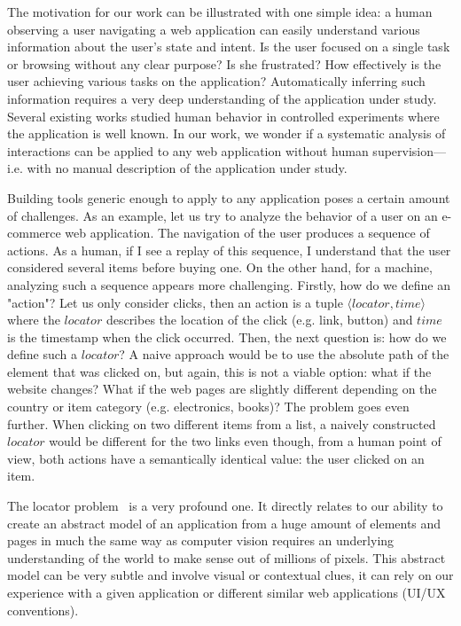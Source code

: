The motivation for our work can be illustrated with one simple idea: a human observing a user navigating a web application can easily understand various information about the user's state and intent.
Is the user focused on a single task or browsing without any clear purpose?
Is she frustrated?
How effectively is the user achieving various tasks on the application?
Automatically inferring such information requires a very deep understanding of the application under study.
Several existing works studied human behavior in controlled experiments where the application is well known.
In our work, we wonder if a systematic analysis of interactions can be applied to any web application without human supervision---i.e. with no manual description of the application under study.

Building tools generic enough to apply to any application poses a certain amount of challenges.
As an example, let us try to analyze the behavior of a user on an e-commerce web application.
The navigation of the user produces a sequence of actions.
As a human, if I see a replay of this sequence, I understand that the user considered several items before buying one.
On the other hand, for a machine, analyzing such a sequence appears more challenging.
Firstly, how do we define an "action"?
Let us only consider clicks, then an action is a tuple $\langle locator, time \rangle$ where the $locator$ describes the location of the click (e.g. link, button) and $time$ is the timestamp when the click occurred.
Then, the next question is: how do we define such a $locator$?
A naive approach would be to use the absolute path of the element that was clicked on, but again, this is not a viable option: what if the website changes?
What if the web pages are slightly different depending on the country or item category (e.g. electronics, books)? 
The problem goes even further.
When clicking on two different items from a list, a naively constructed $locator$ would be different for the two links even though, from a human point of view, both actions have a semantically identical value: the user clicked on an item.

The locator problem~\cite{hammoudi2016record} is a very profound one.
It directly relates to our ability to create an abstract model of an application from a huge amount of elements and pages in much the same way as computer vision requires an underlying understanding of the world to make sense out of millions of pixels.
This abstract model can be very subtle and involve visual or contextual clues, it can rely on our experience with a given application or different similar web applications (UI/UX conventions).

